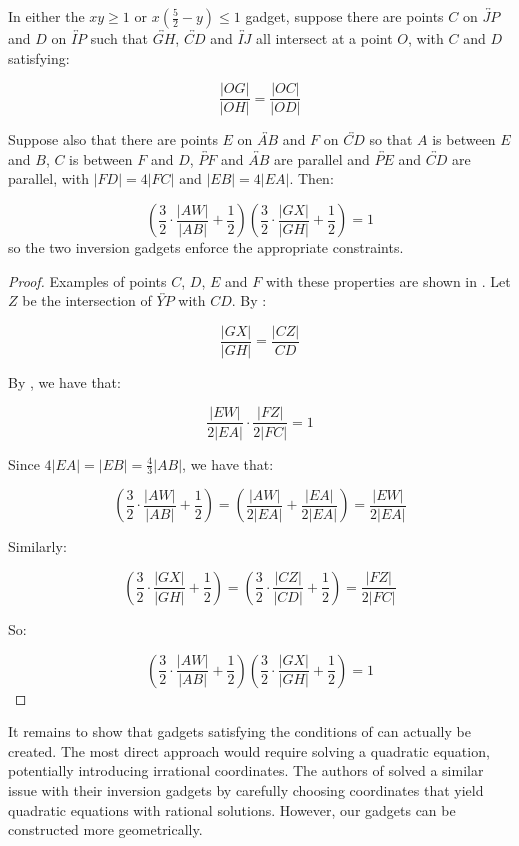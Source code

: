 \begin{lemma}\label{lem:InversionGadgets}
In either the $xy\ge 1$ or $x\left(\frac{5}2-y\right)\le 1$ gadget, suppose there are points $C$ on $\overleftrightarrow{JP}$ and $D$ on $\overleftrightarrow{IP}$ such that $\overleftrightarrow{GH}$, $\overleftrightarrow{CD}$ and $\overleftrightarrow{IJ}$ all intersect at a point $O$, with $C$ and $D$ satisfying:

\[\frac{|OG|}{|OH|}=\frac{|OC|}{|OD|}\]

Suppose also that there are points $E$ on $\overleftrightarrow{AB}$ and $F$ on $\overleftrightarrow{CD}$ so that $A$ is between $E$ and $B$, $C$ is between $F$ and $D$, $\overleftrightarrow{PF}$ and $\overleftrightarrow{AB}$ are parallel and $\overleftrightarrow{PE}$ and $\overleftrightarrow{CD}$ are parallel, with $|FD|=4|FC|$ and $|EB|=4|EA|$. Then:

\[\left(\frac32\cdot\frac{|AW|}{|AB|}+\frac12\right)\left(\frac32\cdot\frac{|GX|}{|GH|}+\frac12\right)=1\]
so the two inversion gadgets enforce the appropriate constraints.
\end{lemma}

\begin{proof}
Examples of points $C$, $D$, $E$ and $F$ with these properties are shown in . Let $Z$ be the intersection of $\overleftrightarrow{YP}$ with $CD$. By :

\[\frac{|GX|}{|GH|}=\frac{|CZ|}{CD}\]

By , we have that:

\[\frac{|EW|}{2|EA|}\cdot\frac{|FZ|}{2|FC|}=1\]

Since $4|EA|=|EB|=\frac43|AB|$, we have that:

\[\left(\frac32\cdot\frac{|AW|}{|AB|}+\frac12\right)=\left(\frac{|AW|}{2|EA|}+\frac{|EA|}{2|EA|}\right)=\frac{|EW|}{2|EA|}\]

Similarly:

\[\left(\frac32\cdot\frac{|GX|}{|GH|}+\frac12\right)=\left(\frac32\cdot\frac{|CZ|}{|CD|}+\frac12\right)=\frac{|FZ|}{2|FC|}\]

So:

\[\left(\frac32\cdot\frac{|AW|}{|AB|}+\frac12\right)\left(\frac32\cdot\frac{|GX|}{|GH|}+\frac12\right)=1\]
\end{proof}

It remains to show that gadgets satisfying the conditions of  can actually be created. The most direct approach would require solving a quadratic equation, potentially introducing irrational coordinates. The authors of \cite{ExistsRHardness} solved a similar issue with their inversion gadgets by carefully choosing coordinates that yield quadratic equations with rational solutions. However, our gadgets can be constructed more geometrically.

